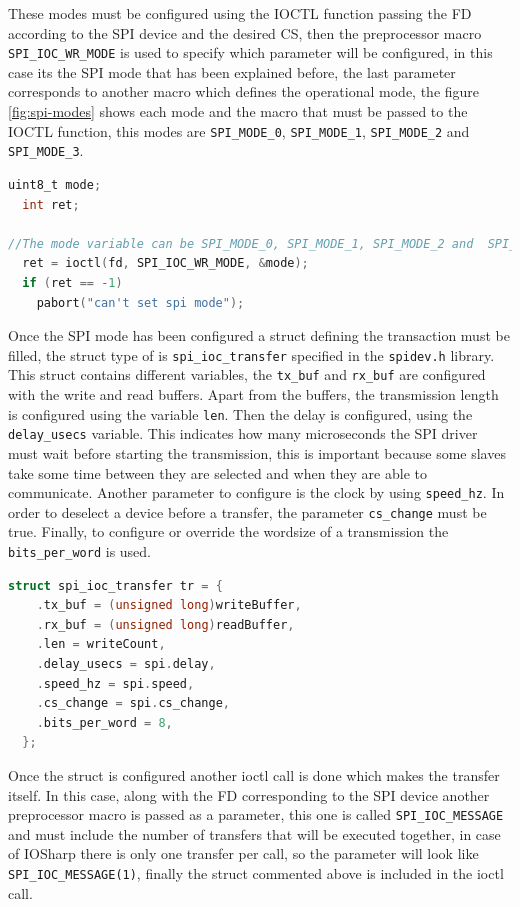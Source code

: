 These modes must be configured using the \gls{IOCTL} function passing the \gls{FD} according to the SPI device and the desired \gls{CS}, then the preprocessor macro \verb!SPI_IOC_WR_MODE! is used to specify which parameter will be configured, in this case its the SPI mode that has been explained before, the last parameter corresponds to another macro which defines the operational mode, the figure \ref{fig:spi-modes} shows each mode and the macro that must be passed to the \gls{IOCTL} function, this modes are \verb!SPI_MODE_0!, \verb!SPI_MODE_1!, \verb!SPI_MODE_2! and \verb!SPI_MODE_3!.

\begin{lstlisting}[language=C, caption={IOSharp.c - SPI Mode configuration}]
uint8_t mode;
  int ret;

//The mode variable can be SPI_MODE_0, SPI_MODE_1, SPI_MODE_2 and  SPI_MODE_3
  ret = ioctl(fd, SPI_IOC_WR_MODE, &mode);
  if (ret == -1)
    pabort("can't set spi mode");
\end{lstlisting}

Once the SPI mode has been configured a struct defining the transaction must be filled, the struct type of is \verb!spi_ioc_transfer! specified in the \verb!spidev.h! library. This struct contains different variables, the \verb!tx_buf! and \verb!rx_buf! are configured with the write and read buffers. Apart from the buffers, the transmission length is configured using the variable \verb!len!. Then the delay is configured, using the \verb!delay_usecs! variable. This indicates how many microseconds the SPI driver must wait before starting the transmission, this is important because some slaves take some time between they are selected and when they are able to communicate. Another parameter to configure is the clock by using \verb!speed_hz!. In order to deselect a device before a transfer, the parameter \verb!cs_change! must be true. Finally, to configure or override the wordsize of a transmission the \verb!bits_per_word! is used.

\begin{lstlisting}[language=C, caption={IOSharp.c - SPI struct configuration}]
struct spi_ioc_transfer tr = {
    .tx_buf = (unsigned long)writeBuffer,
    .rx_buf = (unsigned long)readBuffer,
    .len = writeCount,
    .delay_usecs = spi.delay,
    .speed_hz = spi.speed,
    .cs_change = spi.cs_change,
    .bits_per_word = 8,
  };
\end{lstlisting}

Once the struct is configured another ioctl call is done which makes the transfer itself. In this case, along with the \gls{FD} corresponding to the SPI device another preprocessor macro is passed as a parameter, this one is called \verb!SPI_IOC_MESSAGE! and must include the number of transfers that will be executed together, in case of IOSharp there is only one transfer per call, so the parameter will look like \verb!SPI_IOC_MESSAGE(1)!, finally the struct commented above is included in the ioctl call.

